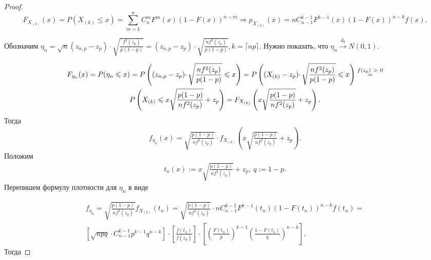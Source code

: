 \begin{proof}

\begin{equation*}
   F_{X_{( k)}}( x) =P( X_{( k)} \leqslant x) =\sum _{m=k}^{n} C_{n}^{m} F^{m}( x)( 1-F( x))^{n-m} \Rightarrow p_{X_{( k)}}( x) =nC_{n-1}^{k-1} F^{k-1}( x)( 1-F( x))^{n-k} f( x). 
\end{equation*}

Обозначим $\displaystyle \eta _{n} =\sqrt{n}( z_{n,p} -z_{p}) \cdotp \sqrt{\frac{f^{2}( z_{p})}{p( 1-p)}} =( z_{n,p} -z_{p}) \cdotp \sqrt{\frac{nf^{2}( z_{p})}{p( 1-p)}} ,k=\lceil np\rceil $. Нужно показать, что $\displaystyle \eta _{n}\xrightarrow{d_{\theta }} N( 0,1)$.


\begin{gather*}
    F_{\eta _{n}}( x) = P( \eta _{n} \leqslant x) = P\left(( z_{n,p} -z_{p}) \cdotp \sqrt{\frac{nf^{2}( z_{p})}{p( 1-p)}} \leqslant x\right) = P\left(( X_{( k)} -z_{p}) \cdotp \sqrt{\frac{nf^{2}( z_{p})}{p( 1-p)}} \leqslant x\right)\overset{f( z_{p}) \  >\ 0}{=}\notag\\ P\left( X_{( k)} \leqslant x\sqrt{\frac{p( 1-p)}{nf^{2}( z_{p})}} +z_{p}\right) = F_{X_{( k)}}\left( x\sqrt{\frac{p( 1-p)}{nf^{2}( z_{p})}} +z_{p}\right) .
\end{gather*}
 Тогда
 \begin{gather*}
     f_{\eta _{n}}( x) =\sqrt{\frac{p( 1-p)}{nf^{2}( z_{p})}}\cdot f_{X_{( k)}}\left( x\sqrt{\frac{p( 1-p)}{nf^{2}( z_{p})}} +z_{p}\right).
 \end{gather*} Положим 
\begin{gather*}
    t_{n}( x) :=x\sqrt{\frac{p( 1-p)}{nf^{2}( z_{p})}} +z_{p},\ q:=1-p.
\end{gather*} 
Перепишем формулу плотности для $\displaystyle \eta _{n}$ в виде

\begin{gather*}
f_{\eta _{n}} = \sqrt{\frac{p( 1-p)}{nf^{2}( z_{p})}} f_{X_{( k)}}( t_{n}) = \sqrt{\frac{p( 1-p)}{nf^{2}( z_{p})}} \cdotp nC_{n-1}^{k-1} F^{k-1}( t_{n})( 1-F( t_{n}))^{n-k} f( t_{n}) =\\ \left[\sqrt{npq} \cdotp C_{n-1}^{k-1} p^{k-1} q^{n-k}\right] \cdotp \left[\frac{f( t_{n})}{f( z_{p})}\right] \cdotp \left[\left(\frac{F( t_{n})}{p}\right)^{k-1}\left(\frac{1-F( t_{n})}{q}\right)^{n-k}\right] .
\end{gather*}
Тогда



\end{proof}
